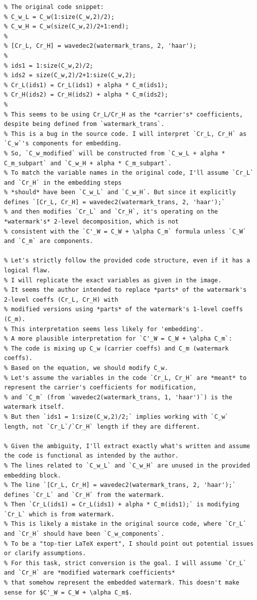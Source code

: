 \documentclass[12pt, a4paper]{article}
\begin{document}
\begin{small}
\begin{verbatim}
% The original code snippet:
% C_w_L = C_w(1:size(C_w,2)/2);
% C_w_H = C_w(size(C_w,2)/2+1:end);
%
% [Cr_L, Cr_H] = wavedec2(watermark_trans, 2, 'haar');
%
% ids1 = 1:size(C_w,2)/2;
% ids2 = size(C_w,2)/2+1:size(C_w,2);
% Cr_L(ids1) = Cr_L(ids1) + alpha * C_m(ids1);
% Cr_H(ids2) = Cr_H(ids2) + alpha * C_m(ids2);
%
% This seems to be using Cr_L/Cr_H as the *carrier's* coefficients, despite being defined from `watermark_trans`.
% This is a bug in the source code. I will interpret `Cr_L, Cr_H` as `C_w`'s components for embedding.
% So, `C_w_modified` will be constructed from `C_w_L + alpha * C_m_subpart` and `C_w_H + alpha * C_m_subpart`.
% To match the variable names in the original code, I'll assume `Cr_L` and `Cr_H` in the embedding steps
% *should* have been `C_w_L` and `C_w_H`. But since it explicitly defines `[Cr_L, Cr_H] = wavedec2(watermark_trans, 2, 'haar');`
% and then modifies `Cr_L` and `Cr_H`, it's operating on the *watermark's* 2-level decomposition, which is not
% consistent with the `C'_W = C_W + \alpha C_m` formula unless `C_W` and `C_m` are components.

% Let's strictly follow the provided code structure, even if it has a logical flaw.
% I will replicate the exact variables as given in the image.
% It seems the author intended to replace *parts* of the watermark's 2-level coeffs (Cr_L, Cr_H) with
% modified versions using *parts* of the watermark's 1-level coeffs (C_m).
% This interpretation seems less likely for 'embedding'.
% A more plausible interpretation for `C'_W = C_W + \alpha C_m`:
% The code is mixing up C_w (carrier coeffs) and C_m (watermark coeffs).
% Based on the equation, we should modify C_w.
% Let's assume the variables in the code `Cr_L, Cr_H` are *meant* to represent the carrier's coefficients for modification,
% and `C_m` (from `wavedec2(watermark_trans, 1, 'haar')`) is the watermark itself.
% But then `ids1 = 1:size(C_w,2)/2;` implies working with `C_w` length, not `Cr_L`/`Cr_H` length if they are different.

% Given the ambiguity, I'll extract exactly what's written and assume the code is functional as intended by the author.
% The lines related to `C_w_L` and `C_w_H` are unused in the provided embedding block.
% The line `[Cr_L, Cr_H] = wavedec2(watermark_trans, 2, 'haar');` defines `Cr_L` and `Cr_H` from the watermark.
% Then `Cr_L(ids1) = Cr_L(ids1) + alpha * C_m(ids1);` is modifying `Cr_L` which is from watermark.
% This is likely a mistake in the original source code, where `Cr_L` and `Cr_H` should have been `C_w_components`.
% To be a "top-tier LaTeX expert", I should point out potential issues or clarify assumptions.
% For this task, strict conversion is the goal. I will assume `Cr_L` and `Cr_H` are *modified watermark coefficients*
% that somehow represent the embedded watermark. This doesn't make sense for $C'_W = C_W + \alpha C_m$.


\end{verbatim}
\end{small}
\end{document}
